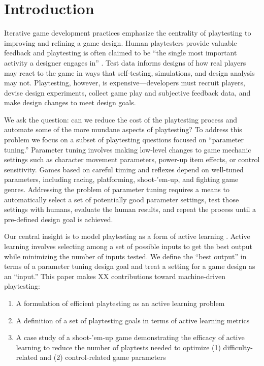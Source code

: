 \documentclass{sig-alternate}
\begin{document}

\section{Introduction}



Iterative game development practices emphasize the centrality of playtesting to improving and refining a game design.
Human playtesters provide valuable feedback and playtesting is often claimed to be ``the single most important activity a designer engages in'' \cite{fullerton2008:playcentric}.
Test data informs designs of how real players may react to the game in ways that self-testing, simulations, and design analysis may not.
Playtesting, however, is expensive---developers must recruit players, devise design experiments, collect game play and subjective feedback data, and make design changes to meet design goals.


We ask the question: can we reduce the cost of the playtesting process and automate some of the more mundane aspects of playtesting?
To address this problem we focus on a subset of playtesting questions focused on ``parameter tuning.''
Parameter tuning involves making low-level changes to game mechanic settings such as character movement parameters, power-up item effects, or control sensitivity.
Games based on careful timing and reflexes depend on well-tuned parameters, including racing, platforming, shoot-'em-up, and fighting game genres.
Addressing the problem of parameter tuning requires a means to automatically select a set of potentially good parameter settings, test those settings with humans, evaluate the human results, and repeat the process until a pre-defined design goal is achieved.


Our central insight is to model playtesting as a form of active learning \cite{settles2012:al-book}.
Active learning involves selecting among a set of possible inputs to get the best output while minimizing the number of inputs tested.
We define the ``best output'' in terms of a parameter tuning design goal and treat a setting for a game design as an ``input.''
This paper makes XX contributions toward machine-driven playtesting:
\begin{enumerate}
\item A formulation of efficient playtesting as an active learning problem
\item A definition of a set of playtesting goals in terms of active learning metrics
\item A case study of a shoot-'em-up game demonstrating the efficacy of active learning to reduce the number of playtests needed to optimize (1) difficulty-related and (2) control-related game parameters
\end{enumerate}
\end{document}
